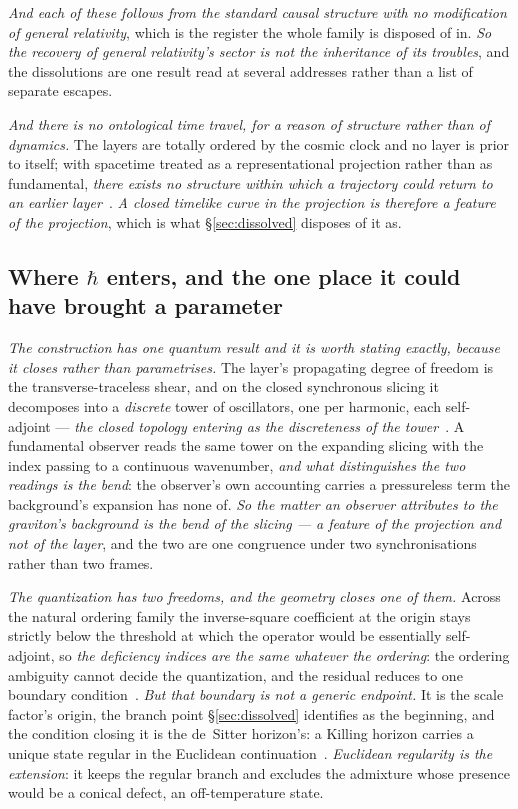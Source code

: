 \documentclass[11pt,a4paper]{article}
\theoremstyle{plain}
\theoremstyle{definition}
\begin{document}
\emph{And each of these follows from the standard causal structure with no modification of general
relativity}, which is the register the whole family is disposed of in. \emph{So the recovery of general
relativity's sector is not the inheritance of its troubles}, and the dissolutions are one result read at several addresses rather than a
list of separate escapes.

\emph{And there is no ontological time travel, for a reason of structure rather than of dynamics.} The layers
are totally ordered by the cosmic clock and no layer is prior to itself; with spacetime treated as a
representational projection rather than as fundamental, \emph{there exists no structure within which a
trajectory could return to an earlier layer}~\cite{JanzenCRframework}. \emph{A closed timelike curve in the
projection is therefore a feature of the projection}, which is what \S\ref{sec:dissolved} disposes of it as.

\subsection{Where $\hbar$ enters, and the one place it could have brought a parameter}

\emph{The construction has one quantum result and it is worth stating exactly, because it closes rather than
parametrises.} The layer's propagating degree of freedom is the transverse-traceless shear, and on the closed
synchronous slicing it decomposes into a \emph{discrete} tower of oscillators, one per harmonic, each
self-adjoint --- \emph{the closed topology entering as the discreteness of the
tower}~\cite{JanzenCanonicalTime}. A fundamental observer reads the same tower on the expanding slicing with
the index passing to a continuous wavenumber, \emph{and what distinguishes the two readings is the bend}: the
observer's own accounting carries a pressureless term the background's expansion has none of. \emph{So the
matter an observer attributes to the graviton's background is the bend of the slicing --- a feature of the
projection and not of the layer}, and the two are one congruence under two synchronisations rather than two
frames.

\emph{The quantization has two freedoms, and the geometry closes one of them.} Across the natural ordering
family the inverse-square coefficient at the origin stays strictly below the threshold at which the operator
would be essentially self-adjoint, so \emph{the deficiency indices are the same whatever the ordering}: the
ordering ambiguity cannot decide the quantization, and the residual reduces to one boundary
condition~\cite{JanzenCanonicalTime}. \emph{But that boundary is not a generic endpoint.} It is the scale factor's origin, the branch point
\S\ref{sec:dissolved} identifies as the beginning, and the condition closing it is the de~Sitter horizon's: a
Killing horizon carries a unique state regular in the Euclidean continuation~\cite{JanzenCanonicalTime}. \emph{Euclidean regularity is
the extension}: it keeps the regular branch and excludes the admixture whose presence would be a conical
defect, an off-temperature state.
\end{document}
